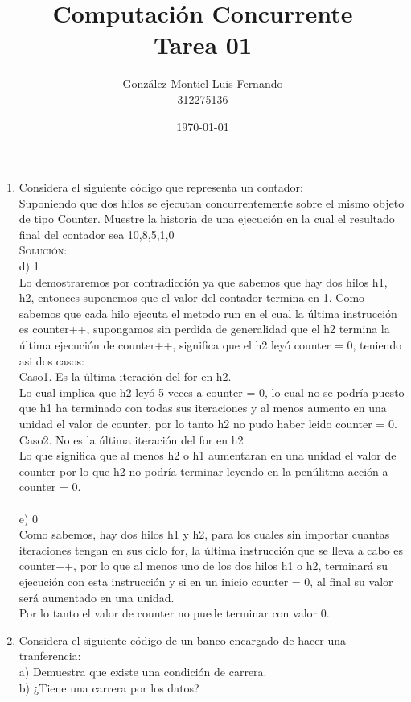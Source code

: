\documentclass[letterpaper,10pt]{article}
\title{Computación Concurrente \\ Tarea 01}
\author{González Montiel Luis Fernando \\
312275136\\ }
\date{\today}
\begin{document}
\maketitle

\begin{enumerate}
    \item Considera el siguiente código que representa un contador:\\
Suponiendo que dos hilos se ejecutan concurrentemente sobre el mismo objeto de tipo Counter. Muestre la historia de una ejecución en la cual el resultado final del contador sea 10,8,5,1,0\\

    \textsc{Solución:}
	\\
	d) 1 \\Lo demostraremos por contradicción ya que sabemos que hay dos hilos h1, h2, entonces suponemos que el valor del contador termina en 1. Como sabemos que cada hilo ejecuta el metodo run en el cual la última instrucción es counter++, supongamos sin perdida de generalidad que el h2 termina la última ejecución de counter++, significa que el h2 leyó counter = 0, teniendo asi dos casos:\\
	Caso1. Es la última iteración del for en h2.\\
	Lo cual implica que h2 leyó 5 veces a counter = 0, lo cual no se podría puesto que h1 ha terminado con todas sus iteraciones y al menos aumento en una unidad el valor de counter, por lo tanto h2 no pudo haber leido counter = 0.\\
	Caso2. No es la última iteración del for en h2.\\
	Lo que significa que al menos h2 o h1 aumentaran en una unidad el valor de counter por lo que h2 no podría terminar leyendo en la penúlitma acción a counter = 0.\\
\\
	e) 0\\Como sabemos, hay dos hilos h1 y h2, para los cuales sin importar cuantas iteraciones tengan en sus ciclo for, la última instrucción que se lleva a cabo es counter++, por lo que al menos uno de los dos hilos h1 o h2, terminará su ejecución con esta instrucción y si en un inicio counter = 0, al final su valor será aumentado en una unidad. \\
	Por lo tanto el valor de counter no puede terminar con valor 0.\\
	
	
	
    \item Considera el siguiente código de un banco encargado de hacer una tranferencia:\\
    a) Demuestra que existe una condición de carrera.\\
	b) ¿Tiene una carrera por los datos?\\


\end{enumerate}
\end{document}
